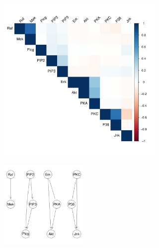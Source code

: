 \documentclass[twocol]{ametsoc}
\begin{document}
\begin{figure}[h]
\centerline{\includegraphics[width = 19pc]{images/molecule_corr.pdf}}
\end{figure}

\begin{figure}[h]
\centerline{\includegraphics[width = 10pc, height = 10pc]{images/m2.pdf}}
\end{figure}
\end{document}
